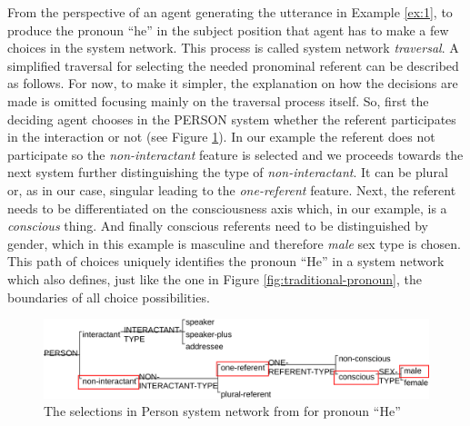 From the perspective of an agent generating the utterance in Example \ref{ex:1}, to produce the pronoun ``he'' in the subject position that agent has to make a few choices in the system network. This process is called system network \textit{traversal}. A simplified traversal for selecting the needed pronominal referent can be described as follows. For now, to make it simpler, the explanation on how the decisions are made is omitted focusing mainly on the traversal process itself. So, first the deciding agent chooses in the PERSON system whether the referent participates in the interaction or not (see Figure \ref{fig:person-system-network}). In our example the referent does not participate so the \textit{non-interactant} feature is selected and we proceeds towards the next system further distinguishing the type of \textit{non-interactant}. It can be plural or, as in our case, singular leading to the \textit{one-referent} feature. Next, the referent needs to be differentiated on the consciousness axis which, in our example, is a \textit{conscious} thing. And finally conscious referents need to be distinguished by gender, which in this example is masculine and therefore \textit{male} sex type is chosen. This path of choices uniquely identifies the pronoun ``He'' in a system network which also defines, just like the one in Figure \ref{fig:traditional-pronoun}, the boundaries of all choice possibilities.
 
\begin{figure}[!ht]
    \centering      
    \includegraphics[width=.90\textwidth]{Figures/Example/person-selections.pdf}      
    \caption{The selections in Person system network from \citet[366]{Halliday2013} for pronoun ``He''}
    \label{fig:person-system-network}
\end{figure}



